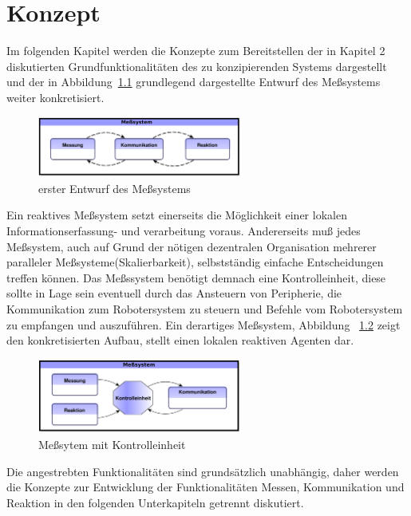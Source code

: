 \documentclass[
	11pt,								%
	a4paper,						%
	oneside,						%
	titlepage,					%
	headsepline,				%
	DIV13,							%
	abstracton,	 				%
	BCOR0cm,						%
	bibliography=totoc, %
]{scrreprt}							%
\begin{document}



\chapter{Konzept}
\label{cha:Konzept}

Im folgenden Kapitel werden die Konzepte zum Bereitstellen der in Kapitel 2 diskutierten Grundfunktionalitäten des zu konzipierenden 
Systems dargestellt und der in Abbildung~\ref{fig:Grundfunktionaltäten} grundlegend dargestellte Entwurf des Meßsystems weiter konkretisiert.

\begin{figure}[htb]
\centering
\includegraphics[width=0.6\textwidth]{images/schau1neu.png}
\caption{erster Entwurf des Meßsystems}
\label{fig:Grundfunktionaltäten}
\end{figure}
Ein reaktives Meßsystem setzt einerseits die Möglichkeit einer lokalen Informationserfassung- und verarbeitung voraus.
Andererseits muß jedes Meßsystem, auch auf Grund der nötigen dezentralen Organisation mehrerer paralleler Meßsysteme(Skalierbarkeit), selbstständig 
einfache Entscheidungen treffen können. Das Meßssystem benötigt demnach eine Kontrolleinheit, diese sollte in Lage sein eventuell durch 
das Ansteuern von Peripherie, die Kommunikation zum Robotersystem zu steuern und Befehle vom Robotersystem zu empfangen und auszuführen. Ein derartiges Meßsystem, 
Abbildung ~\ref{fig:schaubild2} zeigt den konkretisierten Aufbau, stellt einen lokalen reaktiven Agenten\cite{7} dar. 
\begin{figure}[htb]
\centering
\includegraphics[width=0.6\textwidth]{images/schau2cool.png}
\caption{Meßsytem mit Kontrolleinheit}
\label{fig:schaubild2}
\end{figure}

Die angestrebten Funktionalitäten sind grundsätzlich unabhängig, daher werden die Konzepte zur Entwicklung der Funktionalitäten Messen, Kommunikation und 
Reaktion in den folgenden Unterkapiteln getrennt diskutiert.
\end{document}
